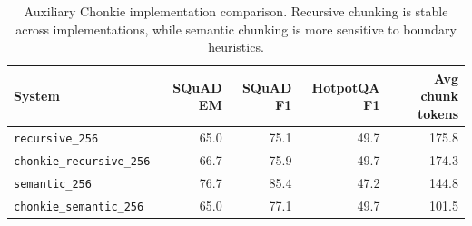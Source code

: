 \begin{table}[t]
\centering
\small
\begin{tabular}{lrrrr}
\toprule
System & SQuAD EM & SQuAD F1 & HotpotQA F1 & Avg chunk tokens \\
\midrule
\texttt{recursive\_256} & 65.0 & 75.1 & 49.7 & 175.8 \\
\texttt{chonkie\_recursive\_256} & 66.7 & 75.9 & 49.7 & 174.3 \\
\texttt{semantic\_256} & 76.7 & 85.4 & 47.2 & 144.8 \\
\texttt{chonkie\_semantic\_256} & 65.0 & 77.1 & 49.7 & 101.5 \\
\bottomrule
\end{tabular}
\caption{Auxiliary Chonkie implementation comparison. Recursive chunking is stable across implementations, while semantic chunking is more sensitive to boundary heuristics.}
\label{tab:chonkie}
\end{table}

